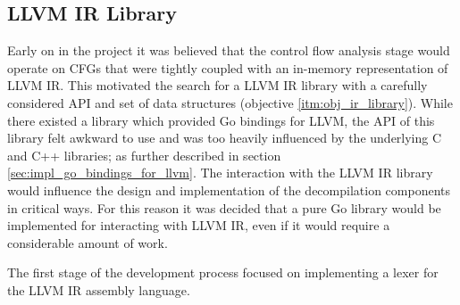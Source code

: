 
\subsection{LLVM IR Library}
\label{sec:impl_llvm_ir_library}

Early on in the project it was believed that the control flow analysis stage would operate on CFGs that were tightly coupled with an in-memory representation of LLVM IR. This motivated the search for a LLVM IR library with a carefully considered API and set of data structures (objective \ref{itm:obj_ir_library}). While there existed a library which provided Go bindings for LLVM, the API of this library felt awkward to use and was too heavily influenced by the underlying C and C++ libraries; as further described in section \ref{sec:impl_go_bindings_for_llvm}. The interaction with the LLVM IR library would influence the design and implementation of the decompilation components in critical ways. For this reason it was decided that a pure Go library would be implemented for interacting with LLVM IR, even if it would require a considerable amount of work.

The first stage of the development process focused on implementing a lexer for the LLVM IR assembly language.






